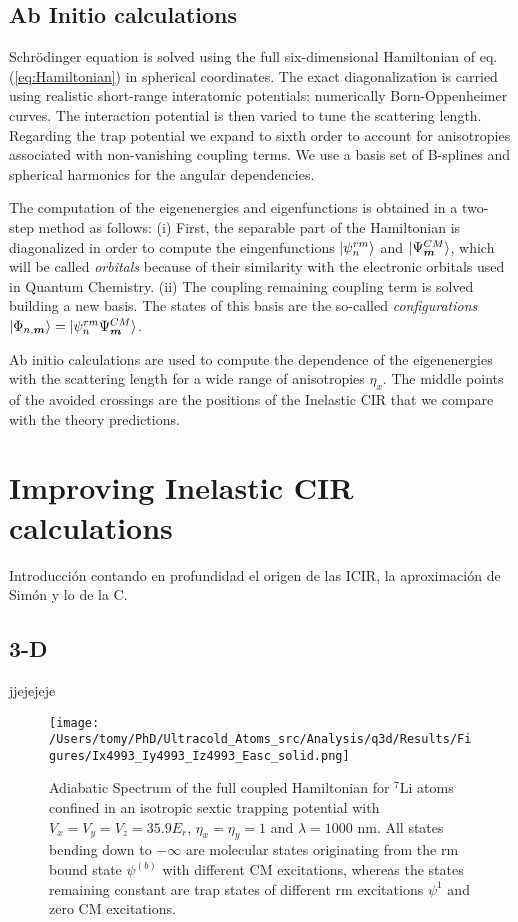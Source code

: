 \documentclass[aps,pre,twocolumn,superscriptaddress,showpacs]{revtex4-1}
\newcommand{\bfeq}[1]{{\boldsymbol{#1}}}
\begin{document}
	
	\subsection{Ab Initio calculations}
		Schrödinger equation is solved using the full six-dimensional Hamiltonian of eq.(\ref{eq:Hamiltonian}) in spherical coordinates. The exact 				diagonalization is carried using realistic short-range interatomic potentials: numerically Born-Oppenheimer curves. The interaction potential is then 		varied to tune the scattering length. Regarding the trap potential we expand to sixth order to account for anisotropies associated with non-vanishing 		coupling terms.  We use a basis set of B-splines and spherical harmonics for the angular dependencies. \cite{PhysRevA.84.062710}
		
		The computation of the eigenenergies and eigenfunctions is obtained in a two-step method as follows: (i) First, the separable part of the 				Hamiltonian is diagonalized in order to compute the eingenfunctions $\ket{\psi^{rm}_n}$ and $\ket{\Psi^{CM}_{\bfeq{m}}}$, which will be called 			\textit{orbitals} because of their similarity with the electronic orbitals used in Quantum Chemistry. (ii) The coupling remaining coupling term is solved 		building a new basis. The states of this basis are the so-called \textit{configurations} $\ket{\Phi_{n, \bfeq{m}}} = \ket{\psi^{rm}_n \Psi^{CM}_{\bfeq{m}}}$. 
		
		Ab initio calculations are used to compute the dependence of the eigenenergies with the scattering length for a wide range of anisotropies $\eta_x$. 
		The middle points of the avoided crossings are the positions of the Inelastic CIR that we compare with the theory predictions.
		
		
\section{Improving Inelastic CIR calculations}  \label{sec:theory}
Introducción contando en profundidad el origen de las ICIR, la aproximación de Simón y lo de la C.

\subsection{3-D}
jjejejeje

	\begin{figure}[h]
   	 \centering
    	\texttt{[image: /Users/tomy/PhD/Ultracold\_Atoms\_src/Analysis/q3d/Results/Figures/Ix4993\_Iy4993\_Iz4993\_Easc\_solid.png]}
    	\caption{Adiabatic Spectrum of the full coupled Hamiltonian for $^7$Li atoms confined in an isotropic sextic trapping potential with $V_x = V_y = V_z = 35.9E_r$, $\eta_x = \eta_y = 1$ and $\lambda=1000$ nm. All states bending down to $-\infty$ are molecular states originating from the rm bound state $\psi^{(b)}$ with different CM excitations, whereas the states remaining constant are trap states of different rm excitations $\psi^{1}$ and zero CM excitations.}
    	\label{fig:3D spectrum}
	\end{figure}
	
\end{document}
